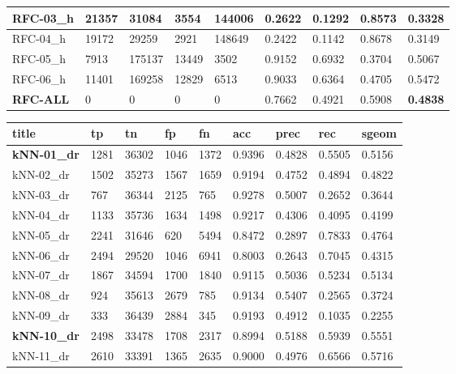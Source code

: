 \documentclass[12pt]{article}
\begin{document}
\begin{flushleft}
\begin{landscape}
\begin{tabular}{| l | l | l | l | l | l | l | l | l |}
			RFC-03\_h & 21357 & 31084 & 3554 & 144006 & 0.2622 & 0.1292 & 0.8573 & 0.3328 \\ \hline
			RFC-04\_h & 19172 & 29259 & 2921 & 148649 & 0.2422 & 0.1142 & 0.8678 & 0.3149 \\ \hline
			RFC-05\_h & 7913 & 175137 & 13449 & 3502 & 0.9152 & 0.6932 & 0.3704 & 0.5067 \\ \hline
			RFC-06\_h & 11401 & 169258 & 12829 & 6513 & 0.9033 & 0.6364 & 0.4705 & 0.5472 \\ \hline
			\textbf{RFC-ALL} & 0 & 0 & 0 & 0 & 0.7662 & 0.4921 & 0.5908 & \textbf{0.4838}\\ \hline
	\end{tabular}
\end{landscape}
\end{flushleft}

	\begin{landscape}
		\begin{tabular}{| l | l | l | l | l | l | l | l | l |}
			\rowcolor{gray!50}
			\hline
			title & tp & tn & fp & fn & acc & prec & rec & sgeom \\ \hline
			\textbf{kNN-01\_dr} & 1281 & 36302 & 1046 & 1372 & 0.9396 & 0.4828 & 0.5505 & 0.5156 \\ \hline
			kNN-02\_dr & 1502 & 35273 & 1567 & 1659 & 0.9194 & 0.4752 & 0.4894 & 0.4822 \\ \hline
			kNN-03\_dr & 767 & 36344 & 2125 & 765 & 0.9278 & 0.5007 & 0.2652 & 0.3644 \\ \hline
			kNN-04\_dr & 1133 & 35736 & 1634 & 1498 & 0.9217 & 0.4306 & 0.4095 & 0.4199 \\ \hline
			kNN-05\_dr & 2241 & 31646 & 620 & 5494 & 0.8472 & 0.2897 & 0.7833 & 0.4764 \\ \hline
			kNN-06\_dr & 2494 & 29520 & 1046 & 6941 & 0.8003 & 0.2643 & 0.7045 & 0.4315 \\ \hline
			kNN-07\_dr & 1867 & 34594 & 1700 & 1840 & 0.9115 & 0.5036 & 0.5234 & 0.5134 \\ \hline
			kNN-08\_dr & 924 & 35613 & 2679 & 785 & 0.9134 & 0.5407 & 0.2565 & 0.3724 \\ \hline
			kNN-09\_dr & 333 & 36439 & 2884 & 345 & 0.9193 & 0.4912 & 0.1035 & 0.2255 \\ \hline
			\textbf{kNN-10\_dr} & 2498 & 33478 & 1708 & 2317 & 0.8994 & 0.5188 & 0.5939 & 0.5551 \\ \hline
			kNN-11\_dr & 2610 & 33391 & 1365 & 2635 & 0.9000 & 0.4976 & 0.6566 & 0.5716 \\ \hline

\end{tabular}
\end{landscape}
\end{document}
